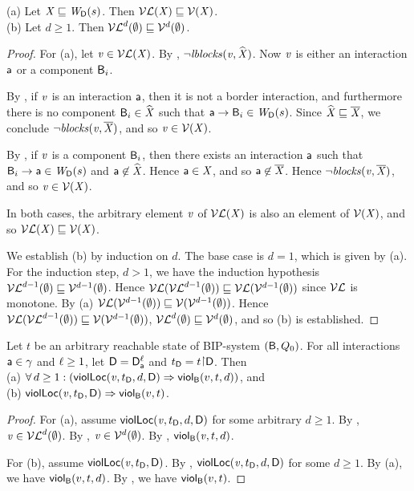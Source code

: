 \begin{proposition}
\label{prop:lV-subg-V}
(a) Let $\XS \subg \lwfg{B}{s}{\DS}$. Then $\lVF{\XS} \subg \VF{\XS}$.\\
(b) Let $d \ge 1$. Then $\lVFs^{d} (\ewfg) \subg \VFs^{d} (\ewfg)$.
\end{proposition}
%
\begin{proof}
For (a), let $\ndv \in \lVF{\XS}$. By , $\neg \lblocks{\ndv}{\complL{\XS}}$.
Now $\ndv$ is either an interaction $\act$ or a component $\B_i$. 

By , if $\ndv$ is an interaction $\act$, then it is not a border interaction, and furthermore there is no
component $\B_i \in \complL{\XS}$ such that $\act \ar \B_i \in \lwfg{\B}{s}{\DS}$. 
Since $\complL{\XS} \subg \compl{\XS}$, we conclude $\neg \blocks{\ndv}{\compl{\XS}}$, and so $\ndv \in \VF{\XS}$.

By , if $\ndv$ is a component $\B_i$, then there exists an interaction $\act$ such that 
$\B_i \ar \act \in \lwfg{\B}{s}{\DS}$ and $\act \not\in \complL{\XS}$. Hence $\act \in \XS$, and so $\act \not\in \compl{\XS}$.
Hence  $\neg \blocks{\ndv}{\compl{\XS}}$, and so $\ndv \in \VF{\XS}$.

In both cases, the arbitrary element $\ndv$ of $\lVF{\XS}$ is also an element of $\VF{\XS}$, and so $\lVF{\XS} \subg \VF{\XS}$.

We establish (b) by induction on $d$. The base case is $d=1$, which is given by (a).
For the induction step, $d > 1$, we have the induction hypothesis $\lVFs^{d-1} (\ewfg) \subg \VFs^{d-1} (\ewfg)$. 
Hence $\lVF{\lVFs^{d-1} (\ewfg)} \subg \lVF{\VFs^{d-1} (\ewfg)}$ since $\lVFs$ is monotone.
By (a) $\lVF{\VFs^{d-1} (\ewfg)} \subg \VF{\VFs^{d-1} (\ewfg)}$. 
Hence  $\lVF{\lVFs^{d-1} (\ewfg)} \subg \VF{\VFs^{d-1} (\ewfg)}$, \ie
  $\lVFs^{d} (\ewfg) \subg \VFs^{d} (\ewfg)$, and so (b) is established.
\end{proof}


\begin{proposition}
\label{prop:locScViol-implies-scViol}
\label{prop:lviol-implies-viol}
Let $t$ be an arbitrary reachable state of BIP-system $(\B, Q_0)$.
For all interactions $\act \in \gamma$ and $\l \ge 1$, let $\DS = \dsks{\act}{\l}$ and $t_\DS = t \pj \dsk{\act}{\l}$.
Then\\
\ind (a) $\fa d \ge 1:  (\scVLd{\ndv}{d}{t_\DS}{\act}{\l} \imp \scVd{v}{d}{t}) $, and\\
\ind (b) $\scVL{\ndv}{t_\DS}{\act}{\l} \imp \scV{v}{t}$.
\end{proposition}
%
\begin{proof}
For (a), assume $\scVLd{\ndv}{d}{t_\DS}{\act}{\l}$ for some arbitrary $d \ge 1$.
By ,  $\ndv \in \lVFs^{d} (\ewfg)$.
By ,  $\ndv  \in \VFs^{d} (\ewfg)$.
By , $\scVd{\ndv}{d}{t}$.

For (b), assume $\scVL{\ndv}{t_\DS}{\act}{\l}$. By ,
$\scVLd{\ndv}{d}{t_\DS}{\act}{\l}$ for some $d \ge 1$. By (a), we have $\scVd{v}{d}{t}$.
By , we have $\scV{v}{t}$.
\end{proof}
